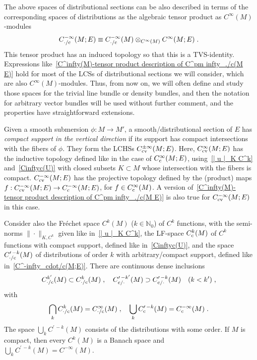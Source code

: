 \documentclass{memo-l}
\theoremstyle{plain}
\theoremstyle{definition}
\theoremstyle{remark}
\newcommand{\N}{\mathbb{N}}
\newcommand{\co}{{\text{\rm c}}}
\newcommand{\cv}{{\text{\rm cv}}}
\newcommand{\Cinftyc}{C^\infty_{\text{\rm c}}}
\newcommand{\Cinftycv}{C^\infty_{\text{\rm cv}}}
\numberwithin{section}{chapter}
\numberwithin{equation}{section}%
\begin{document}
The above spaces of distributional sections can be also described in terms of the corresponding spaces of distributions as the algebraic tensor product as $C^\infty(M)$-modules \cite[Eq.~(2.5)]{AlvKordyLeichtnam-conormal}
\begin{equation}\label{C^infty(M)-tensor product description of C^pm infty_./c(M E)}
C^{-\infty}_{{\cdot}/\co}(M;E)\equiv C^{-\infty}_{{\cdot}/\co}(M)\otimes_{C^\infty(M)}C^\infty(M;E)\;.
\end{equation}
This tensor product has an induced topology so that this is a TVS-identity. Expressions like~\eqref{C^infty(M)-tensor product description of C^pm infty_./c(M E)} hold for most of the LCSs of distributional sections we will consider, which are also $C^\infty(M)$-modules. Thus, from now on, we will often define and study those spaces for the trivial line bundle or density bundles, and then the notation for arbitrary vector bundles will be used without further comment, and the properties have straightforward extensions.

Given a smooth submersion $\phi:M\to M'$, a smooth/distributional section of $E$ has \emph{compact support in the vertical direction} if its support has compact intersections with the fibers of $\phi$. They form the LCHSs $C^{\pm\infty}_\cv(M;E)$. \index{$C^{\pm\infty}_\cv(M;E)$} Here, $\Cinftycv(M;E)$ has the inductive topology defined like in the case of $\Cinftyc(M;E)$, using~\eqref{| u |_K C^k} and~\eqref{Cinftyc(U)} with closed subsets $K\subset M$ whose intersection with the fibers is compact. $C^{-\infty}_\cv(M;E)$ has the projective topology defined by the (product) maps $f:C^{-\infty}_\cv(M;E)\to C^{-\infty}_\co(M;E)$, for $f\in\Cinftyc(M)$. A version of~\eqref{C^infty(M)-tensor product description of C^pm infty_./c(M E)} is also true for $C^{-\infty}_\cv(M;E)$ in this case.

Consider also the Fr\'echet space $C^k(M)$ ($k\in\N_0$) of $C^k$ functions, with the semi-norms $\|{\cdot}\|_{K,C^k}$ given like in~\eqref{| u |_K C^k}, the LF-space $C^k_\co(M)$ of $C^k$ functions with compact support, defined like in~\eqref{Cinftyc(U)}, and the space $C^{\prime\,-k}_{{\cdot}/\co}(M)$ \index{$C^{\prime\,-k}_{{\cdot}/\co}(M)$} of distributions of order $k$ with arbitrary/compact support, defined like in~\eqref{C^-infty_cdot/c(M;E)}. There are continuous dense inclusions
\begin{equation}\label{C^prime -k'(M E) supset C^prime -k(M E)}
C^{k'}_{{\cdot}/\co}(M)\subset C^k_{{\cdot}/\co}(M)\;,\quad 
C^{\prime\,-k'}_{\co/{\cdot}}(M)\supset C^{\prime\,-k}_{\co/{\cdot}}(M)\quad(k<k')\;,
\end{equation}
with
\begin{equation}\label{bigcap_k C^k_./c(M) = C^infty_./c(M)}
\bigcap_kC^k_{{\cdot}/\co}(M)=C^{\infty}_{{\cdot}/\co}(M)\;,\quad
\bigcup_kC^{\prime\,-k}_\co(M)=C^{-\infty}_\co(M)\;.
\end{equation}
The space $\bigcup_kC^{\prime\,-k}(M)$ consists of the distributions with some order. If $M$ is compact, then every $C^k(M)$ is a Banach space and $\bigcup_kC^{\prime\,-k}(M)=C^{-\infty}(M)$.
\end{document}

